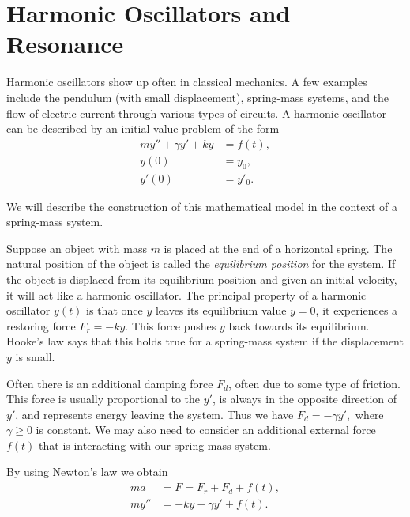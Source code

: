 
\pagebreak
\section{Harmonic Oscillators and Resonance} Harmonic oscillators show up often in classical mechanics. 
A few examples include the pendulum (with small 
 displacement), spring-mass systems, and the flow of electric current through various types of circuits. 
A harmonic oscillator can be described by an initial value problem of the form 
\begin{align*}
	my'' + \gamma y' + ky &= f(t) ,\\
	y(0) &= y_0,\\
	y'(0) &= y'_0.
\end{align*}

We will describe the construction of this mathematical model in the context of a spring-mass system.

Suppose an object with mass $m$ is placed at the end of a horizontal spring. 
The natural position of the object is called the \textit{equilibrium position} for the system.
If the object is displaced from its equilibrium position and given an initial velocity,  
it will act like a harmonic oscillator.
The principal property of a harmonic oscillator $y(t)$ is that once $y$ leaves its equilibrium value $y = 0$, it experiences a restoring force $F_r = -ky.$ 
This force pushes $y$ back towards its equilibrium. 
Hooke's law says that this holds true for a 
spring-mass system if the displacement $y$ is small.

Often there is an additional damping force $F_d$, often due to some type of friction. This force is usually proportional to the $y'$, is always in the opposite direction of $y'$, and represents energy leaving the system. 
Thus we have $F_d = -\gamma y', $ where $ \gamma \geq 0$ is constant. 
We may also need to consider an additional external force $f(t)$ that is interacting with our spring-mass system.

By using Newton's law we obtain
\begin{align*}
ma &= F = F_r + F_d + f(t),\\
my'' &= -ky -\gamma y' + f(t).
\end{align*}



